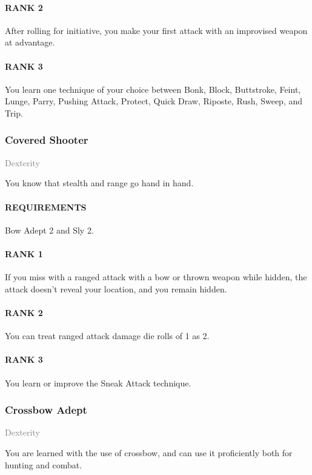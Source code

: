 \paragraph{RANK 2} After rolling for initiative, you make your first attack with an improvised weapon at advantage.
\paragraph{RANK 3} You learn one technique of your choice between Bonk, Block, Buttstroke, Feint, Lunge, Parry, Pushing Attack, Protect, Quick Draw, Riposte, Rush, Sweep, and Trip.

\subsubsection{Covered Shooter} \label{feat::coveredshooter}
\small{\textcolor{gray}{Dexterity}}

\normalsize
You know that stealth and range go hand in hand.
\paragraph{REQUIREMENTS} Bow Adept 2 and Sly 2.
\paragraph{RANK 1} If you miss with a ranged attack with a bow or thrown weapon while hidden, the attack doesn't reveal your location, and you remain hidden.
\paragraph{RANK 2} You can treat ranged attack damage die rolls of 1 as 2.
\paragraph{RANK 3} You learn or improve the Sneak Attack technique.

\subsubsection{Crossbow Adept} \label{feat::crossbowadept}
\small{\textcolor{gray}{Dexterity}}

\normalsize
You are learned with the use of crossbow, and can use it proficiently both for hunting and combat.
